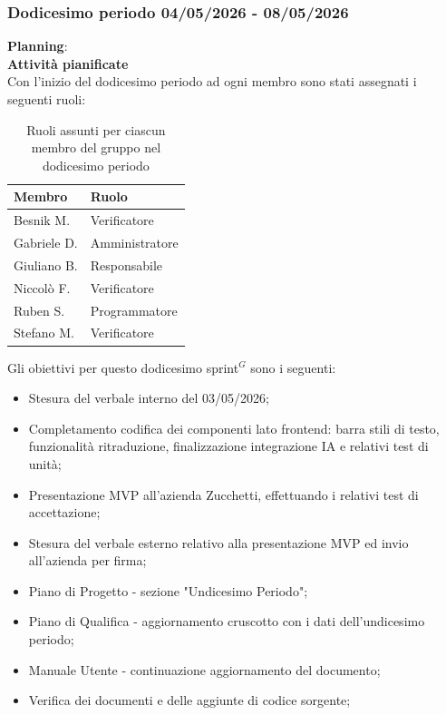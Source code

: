 \documentclass[a4paper,10pt]{article}
\begin{document}
\subsubsection{Dodicesimo periodo 04/05/2026 - 08/05/2026}
\textbf{Planning}: \\
\textbf{Attività pianificate} \\ Con l'inizio del dodicesimo periodo ad ogni membro sono stati assegnati i seguenti ruoli:
\begin{table}[H]
\centering
\begin{tabular}{|l|l|}
\hline
\textbf{Membro} & \textbf{Ruolo} \\
\hline
Besnik M.  & Verificatore \\
\hline
Gabriele D.  & Amministratore \\
\hline
Giuliano B. & Responsabile \\
\hline
Niccolò F. & Verificatore \\
\hline
Ruben S. & Programmatore \\
\hline
Stefano M.  & Verificatore \\
\hline
\end{tabular}
\caption{Ruoli assunti per ciascun membro del gruppo nel dodicesimo periodo}
\end{table}

Gli obiettivi per questo dodicesimo sprint$^G$ sono i seguenti:
\begin{itemize}
  \item Stesura del verbale interno del 03/05/2026;
  \item Completamento codifica dei componenti lato frontend: barra stili di testo, funzionalità ritraduzione, finalizzazione integrazione IA e relativi test di unità;
  \item Presentazione MVP all'azienda Zucchetti, effettuando i relativi test di accettazione;
  \item Stesura del verbale esterno relativo alla presentazione MVP ed invio all'azienda per firma;
  \item Piano di Progetto - sezione "Undicesimo Periodo";
  \item Piano di Qualifica - aggiornamento cruscotto con i dati dell'undicesimo periodo;
  \item Manuale Utente - continuazione aggiornamento del documento;
  \item Verifica dei documenti e delle aggiunte di codice sorgente;
\end{itemize}
\end{document}
